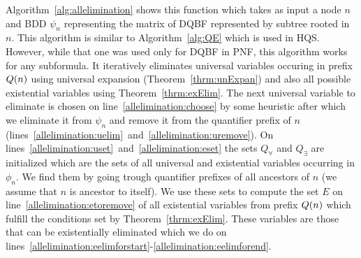 \documentclass[
  digital, %
  twoside, %
  table,   %
  nolof,     %
  nolot,     %
]{fithesis3}
\theoremstyle{definition}
\theoremstyle{remark}
\begin{document}
Algorithm~\ref{alg:allelimination} shows this function which takes as input a node $n$ and BDD $\psi_n$ representing the matrix of DQBF represented by subtree rooted in $n$. This algorithm is similar to Algorithm~\ref{alg:QE} which is used in HQS. However, while that one was used only for DQBF in PNF, this algorithm works for any subformula. It iteratively eliminates universal variables occuring in prefix $Q({n})$ using universal expansion (Theorem~\ref{thrm:unExpan}) and also all possible existential variables using Theorem~\ref{thrm:exElim}. The next universal variable to eliminate is chosen on line~\ref{allelimination:choose} by some heuristic after which we eliminate it from $\psi_n$ and remove it from the quantifier prefix of $n$ (lines~\ref{allelimination:uelim}~and~\ref{allelimination:uremove}). On lines~\ref{allelimination:uset}~and~\ref{allelimination:eset} the sets $Q_{\forall}$ and $Q_{\exists}$ are initialized which are the sets of all universal and existential variables occurring in $\phi_n$. We find them by going trough quantifier prefixes of all ancestors of $n$ (we assume that $n$ is ancestor to itself). We use these sets to compute the set $E$ on line~\ref{allelimination:etoremove} of all existential variables from prefix $Q({n})$ which fulfill the conditions set by Theorem~\ref{thrm:exElim}. These variables are those that can be existentially eliminated which we do on lines~\ref{allelimination:eelimforstart}-\ref{allelimination:eelimforend}.
\end{document}
